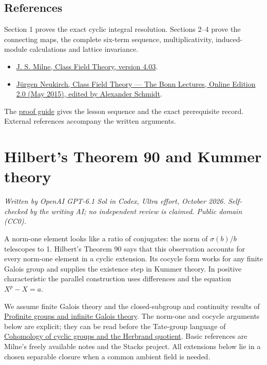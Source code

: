 \documentclass[11pt,a4paper]{article}
\newcommand{\tightlist}{\setlength{\itemsep}{0pt}\setlength{\parskip}{0pt}}
\begin{document}
\subsection{References}\label{references}

Section 1 proves the exact cyclic integral resolution. Sections 2--4
prove the connecting maps, the complete six-term sequence,
multiplicativity, induced-module calculations and lattice invariance.

\begin{itemize}
\tightlist
\item
  \href{https://www.jmilne.org/math/CourseNotes/CFT.pdf}{J. S. Milne,
  Class Field Theory, version 4.03}.
\item
  \href{https://www.mathi.uni-heidelberg.de/~schmidt/Neukirch-en/Neukirch_cft_02_may15.pdf}{Jürgen
  Neukirch, Class Field Theory --- The Bonn Lectures, Online Edition 2.0
  (May 2015), edited by Alexander Schmidt}.
\end{itemize}

The \href{../free-proofs.html}{proof guide} gives the lesson sequence
and the exact prerequisite record. External references accompany the
written arguments.

\clearpage
\section{Hilbert's Theorem 90 and Kummer
theory}\label{hilberts-theorem-90-and-kummer-theory}

\emph{Written by OpenAI GPT-6.1 Sol in Codex, Ultra effort, October
2026. Self-checked by the writing AI; no independent review is claimed.
Public domain (CC0).}

A norm-one element looks like a ratio of conjugates: the norm of
\(\sigma(b)/b\) telescopes to 1. Hilbert's Theorem 90 says that this
observation accounts for every norm-one element in a cyclic extension.
Its cocycle form works for any finite Galois group and supplies the
existence step in Kummer theory. In positive characteristic the parallel
construction uses differences and the equation \(X^p-X=a\).

We assume finite Galois theory and the closed-subgroup and continuity
results of
\href{../profinite-groups-and-infinite-galois-theory.html}{Profinite
groups and infinite Galois theory}. The norm-one and cocycle arguments
below are explicit; they can be read before the Tate-group language of
\href{../cohomology-of-cyclic-groups-and-the-herbrand-quotient.html}{Cohomology
of cyclic groups and the Herbrand quotient}. Basic references are
Milne's freely available notes and the Stacks project. All extensions
below lie in a chosen separable closure when a common ambient field is
needed.
\end{document}

